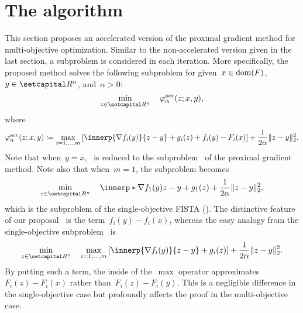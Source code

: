 \documentclass[../main]{subfiles}
\begin{document}
\section{The algorithm} 
This section proposes an accelerated version of the proximal gradient method for multi-objective optimization.
Similar to the non-accelerated version given in the last section, a subproblem is considered in each iteration.
More specifically, the proposed method solves the following subproblem for given~$x \in \operatorname{dom}(F)$,~$y \in \setR^n$, and~$\alpha > 0$:
\begin{equation} \label{eq:acc_pgm_subprob}
    \min_{z \in \setR^n} \quad \varphi^\acc_\alpha(z; x, y)
    ,\end{equation}
where
\begin{equation} \label{eq:acc_pgm_obj}
    \varphi^\acc_\alpha(z; x, y) \coloneqq \max_{i = 1, \dots, m} \left[ \innerp{\nabla f_i(y)}{z - y} + g_i(z) + f_i(y) - F_i(x) \right] + \frac{1}{2 \alpha} \norm{z - y}_2^2
    .\end{equation}
Note that when~$y = x$,~ is reduced to the subproblem~ of the proximal gradient method.
Note also that when~$m = 1$, the subproblem becomes
\begin{equation} \label{eq:single_fista_subprob}
    \min_{z \in \setR^n} \quad \innerp*{\nabla f_1(y)}{z - y} + g_1(z) + \frac{1}{2 \alpha} \norm{z - y}_2^2
    ,\end{equation}
which is the subproblem of the single-objective FISTA ().
The distinctive feature of our proposal~ is the term~$f_i(y) - f_i(x)$, whereas the easy analogy from the single-objective subproblem~ is
\begin{equation}
    \min_{z \in \setR^n} \quad \max_{i = 1, \dots, m} \left[ \innerp{\nabla f_i(y)}{z - y} + g_i(z) \right] + \frac{1}{2 \alpha} \norm{z - y}_2^2
    .\end{equation}
By putting such a term, the inside of the~$\max$ operator approximates~$F_i(z) - F_i(x)$ rather than~$F_i(z) - F_i(y)$.
This is a negligible difference in the single-objective case but profoundly affects the proof in the multi-objective case.
\end{document}
